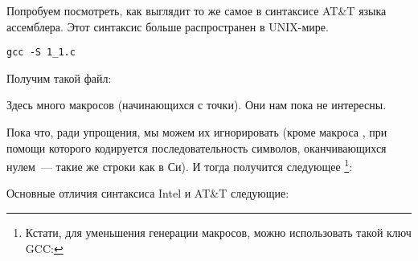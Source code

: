 \label{ATT_syntax}

Попробуем посмотреть, как выглядит то же самое в синтаксисе AT\&T языка ассемблера.
Этот синтаксис больше распространен в UNIX-мире.

\begin{lstlisting}[caption=компилируем в GCC 4.7.3]
gcc -S 1_1.c
\end{lstlisting}

Получим такой файл:



Здесь много макросов (начинающихся с точки). Они нам пока не интересны.

Пока что, ради упрощения, мы можем 
их игнорировать (кроме макроса , при помощи которого кодируется последовательность символов, 
оканчивающихся нулем~--- такие же строки как в Си). И тогда получится следующее
\footnote{Кстати, для уменьшения генерации  макросов, можно использовать такой ключ GCC: }:



\myindex{\ATTSyntax}
\myindex{\IntelSyntax}
Основные отличия синтаксиса Intel и AT\&T следующие:

